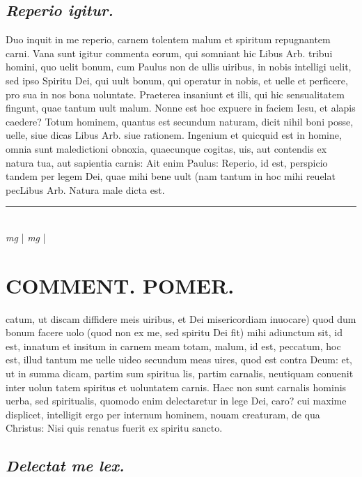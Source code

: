 \documentclass{article}
\begin{document}
\begin{pages}
\subsection*{\textit{Reperio igitur. }}\pstart Duo inquit in me reperio, carnem tolentem malum et spiritum repugnantem carni. Vana sunt igitur commenta eorum, qui somniant hic Libus Arb.  tribui homini, quo uelit bonum, cum Paulus non de ullis uiribus, in nobis intelligi uelit, sed ipso Spiritu Dei, qui uult bonum, qui operatur in nobis, et uelle et perficere, pro sua in nos bona uoluntate. Praeterea insaniunt et illi, qui hic sensualitatem fingunt, quae tantum uult malum. Nonne est hoc expuere in faciem Iesu, et alapis caedere? Totum hominem, quantus est secundum naturam, dicit nihil boni posse, uelle, siue dicas Libus Arb. siue rationem. Ingenium et quicquid est in homine, omnia sunt maledictioni obnoxia, quaecunque cogitas, uis, aut contendis ex natura tua, aut sapientia carnis: Ait enim Paulus: Reperio, id est, perspicio tandem per legem Dei, quae mihi bene uult (nam tantum in hoc mihi reuelat pecLibus Arb.  Natura male dicta est.   \pend
\vspace{0.5cm}\noindent
\vspace{0.2cm}\rule{1cm}{0.2pt}\\ 
\hspace{0.2cm}\textit{mg}
\footnotesize 
\normalsize| 
\hspace{0.2cm}\textit{mg}
\footnotesize 
\normalsize| 
\section*{COMMENT. POMER.  }\pstart catum, ut discam diffidere meis uiribus, et Dei misericordiam inuocare) quod dum bonum facere uolo (quod non ex me, sed spiritu Dei fit) mihi adiunctum sit, id est, innatum et insitum in carnem meam totam, malum, id est, peccatum, hoc est, illud tantum me uelle uideo secundum meas uires, quod est contra Deum: et, ut in summa dicam, partim sum spiritua lis, partim carnalis, neutiquam conuenit inter uolun tatem spiritus et uoluntatem carnis.  \pend\pstart Haec non sunt carnalis hominis uerba, sed spiritualis, quomodo enim delectaretur in lege Dei, caro? cui maxime displicet, intelligit ergo per internum hominem, nouam creaturam, de qua Christus: Nisi quis renatus fuerit ex spiritu sancto.   \pend
{}
{}
\subsection*{\textit{Delectat me lex. }}
{}

\end{pages}
\end{document}
